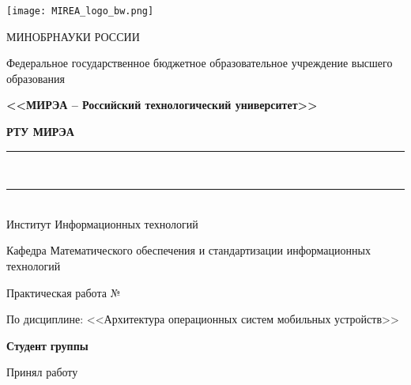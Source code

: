 
\begin{titlepage}
	\begin{center}
		\texttt{[image: MIREA\_logo\_bw.png]}
		
		\hfill \break
		{\small МИНОБРНАУКИ РОССИИ}
		
		Федеральное государственное бюджетное образовательное учреждение высшего образования
		
		\textbf{<<МИРЭА – Российский технологический университет>>}
		
		\textbf{РТУ МИРЭА}
		
		\rule{\linewidth}{0.5pt} \\ [-0.65cm]
		\rule{\linewidth}{0.5pt} \\ [+0.35cm]
		
		Институт Информационных технологий 
		
		Кафедра Математического обеспечения и стандартизации информационных технологий 
		
		\vfill
		
		\makeatletter		
		\ifdefined\@worknum
			Практическая работа №\@worknum
		\fi
		
		По дисциплине: <<Архитектура операционных систем мобильных устройств>>
		
		\vfill
		
		\ifdefined\@author
			\textbf{Студент}
				\ifdefined\@group
					\textbf{группы} \@group
				\fi
			\hfill \@author \\
		\fi
		
		\ifdefined\@examiner
			\hfill \break
			Принял работу \hfill \@examiner \\
		\fi
		\makeatother
			
		\vfill
			
		\thispagestyle{titlepagefooter}
	\end{center}
	\clearpage
\end{titlepage}
